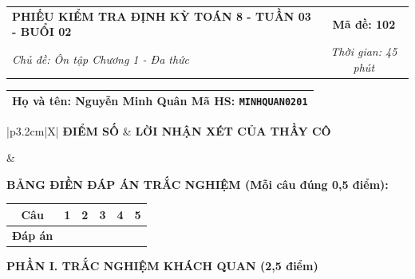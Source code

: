 \documentclass[12pt,a4paper]{article}
\begin{document}
\newpage


\noindent
\begin{tabularx}{\linewidth}{|X|c|}
\hline
\textbf{PHIẾU KIỂM TRA ĐỊNH KỲ TOÁN 8 - TUẦN 03 - BUỔI 02} & \textbf{Mã đề: 102} \\
\textit{Chủ đề: Ôn tập Chương 1 - Đa thức} & \textit{Thời gian: 45 phút} \\
\hline
\end{tabularx}

\vspace{1mm}

\noindent
\begin{tabularx}{\linewidth}{|X|}
\hline
\rule[-2mm]{0pt}{7.5mm}\textbf{Họ và tên:} \textbf{\large Nguyễn Minh Quân} \hfill \textbf{Mã HS:} \texttt{MINHQUAN0201} \quad \\
\hline
\end{tabularx}

\vspace{1mm}

\noindent
\begin{tabularx}{\linewidth}{|p{3.2cm}|X|}
\hline
\centering\textbf{ĐIỂM SỐ} & \centering\textbf{LỜI NHẬN XÉT CỦA THẦY CÔ} \tabularnewline
\hline
\rule{0pt}{1.3cm} & \tabularnewline
\hline
\end{tabularx}

\vspace{1.2mm}

\noindent\textbf{BẢNG ĐIỀN ĐÁP ÁN TRẮC NGHIỆM (Mỗi câu đúng 0,5 điểm):}
\vspace{0.8mm}

\noindent
\renewcommand{\arraystretch}{1.35}
\begin{tabularx}{\linewidth}{|c|*{5}{>{\centering\arraybackslash}X|}}
\hline
\textbf{Câu} & \textbf{1} & \textbf{2} & \textbf{3} & \textbf{4} & \textbf{5} \\
\hline
\textbf{Đáp án} & & & & & \\
\hline
\end{tabularx}
\renewcommand{\arraystretch}{1.0}

\vspace{1.5mm}

\noindent\textbf{\large PHẦN I. TRẮC NGHIỆM KHÁCH QUAN (2,5 điểm)}
\vspace{1mm}
\end{document}

